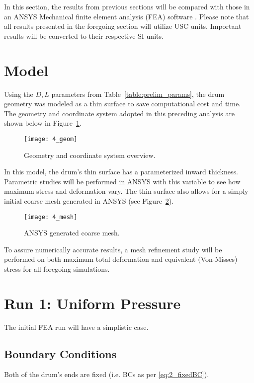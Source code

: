 In this section, the results from previous sections will be compared with those in an ANSYS Mechanical finite element analysis (FEA) software \cite{ANSYS}. Please note that all results presented in the foregoing section will utilize USC units. Important results will be converted to their respective SI units.

\section{Model}

Using the $D, L$ parameters from Table~\ref{table:prelim_params}, the drum geometry was modeled as a thin surface to save computational cost and time. The geometry and coordinate system adopted in this preceding analysis are shown below in Figure~\ref{fig:4_geom}.

\begin{figure}[H]
	\centering
	\texttt{[image: 4\_geom]}
	\caption{Geometry and coordinate system overview.}
	\label{fig:4_geom}
\end{figure}

In this model, the drum's thin surface has a parameterized inward thickness. Parametric studies will be performed in ANSYS with this variable to see how maximum stress and deformation vary. The thin surface also allows for a simply initial coarse mesh generated in ANSYS (see Figure~\ref{fig:4_mesh}).

\begin{figure}[H]
	\centering
	\texttt{[image: 4\_mesh]}
	\caption{ANSYS generated coarse mesh.}
	\label{fig:4_mesh}
\end{figure}

To assure numerically accurate results, a mesh refinement study will be performed on both maximum total deformation and equivalent (Von-Misses) stress for all foregoing simulations.



\section{Run 1: Uniform Pressure}

The initial FEA run will have a simplistic case. 

\subsection{Boundary Conditions}
\label{subsection:R1BC}
Both of the drum's ends are fixed (i.e. BCs as per \ref{eq:2_fixedBC}).\\

